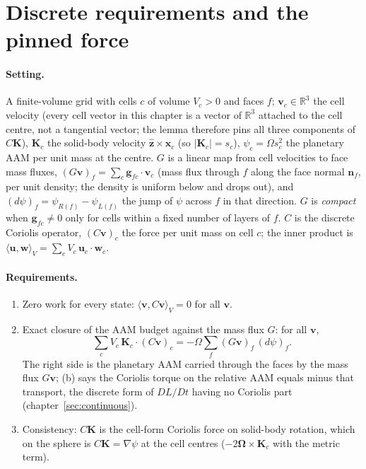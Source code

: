 \section{Discrete requirements and the pinned force}
\label{sec:pinning}

\paragraph{Setting.} A finite-volume grid with cells $c$ of volume $V_c>0$ and faces $f$; $\bm v_c\in\mathbb R^3$ the
cell velocity (every cell vector in this chapter is a vector of $\mathbb R^3$ attached to the cell centre, not a
tangential vector; the lemma therefore pins all three components of $C\bm K$), $\bm K_c$ the solid-body velocity
$\hat{\bm z}\times\bm x_c$ (so $|\bm K_c|=s_c$), $\psi_c=\Omega s_c^2$ the planetary AAM per unit mass at the centre.
$G$ is a linear map from cell velocities to face mass fluxes, $(G\bm v)_f=\sum_c \bm g_{fc}\cdot\bm v_c$ (mass flux
through $f$ along the face normal $\bm n_f$, per unit density; the density is uniform below and drops out), and
$(d\psi)_f=\psi_{R(f)}-\psi_{L(f)}$ the jump of $\psi$ across $f$ in that direction. $G$ is \emph{compact} when
$\bm g_{fc}\ne0$ only for cells within a fixed number of layers of $f$. $C$ is the discrete Coriolis operator,
$(C\bm v)_c$ the force per unit mass on cell $c$; the inner product is $\langle\bm u,\bm w\rangle_V=\sum_c V_c\,
\bm u_c\cdot\bm w_c$.

\paragraph{Requirements.}
\begin{enumerate}
\item[(a)] Zero work for every state: $\langle\bm v,C\bm v\rangle_V=0$ for all $\bm v$.
\item[(b)] Exact closure of the AAM budget against the mass flux $G$: for all $\bm v$,
\[ \sum_c V_c\,\bm K_c\cdot(C\bm v)_c=-\Omega\sum_f (G\bm v)_f\,(d\psi)_f .\]
The right side is the planetary AAM carried through the faces by the mass flux $G\bm v$; (b) says the Coriolis
torque on the relative AAM equals minus that transport, the discrete form of $DL/Dt$ having no Coriolis part
(chapter~\ref{sec:continuous}).
\item[(c)] Consistency: $C\bm K$ is the cell-form Coriolis force on solid-body rotation, which on the sphere is
$C\bm K=\nabla\psi$ at the cell centres ($-2\bm\Omega\times\bm K_c$ with the metric term).
\end{enumerate}

